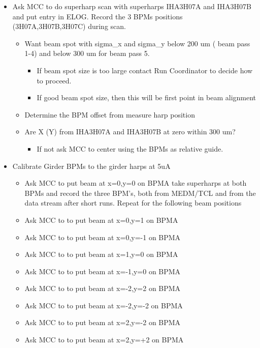 \documentclass[]{article}
\begin{document}
	\begin{itemize}
		\item
		Ask MCC to do superharp scan with superharps IHA3H07A and IHA3H07B and
		put entry in ELOG. Record the 3 BPMs positions (3H07A,3H07B,3H07C)
		during scan.
		
		\begin{itemize}
			\item
			Want beam spot with sigma\_x and sigma\_y below 200 um ( beam pass
			1-4) and below 300 um for beam pass 5.
			
			\begin{itemize}
				\item
				If beam spot size is too large contact Run Coordinator to decide
				how to proceed.
				\item
				If good beam spot size, then this will be first point in beam
				alignment
			\end{itemize}
			\item
			Determine the BPM offset from measure harp position
			\item
			Are X (Y) from IHA3H07A and IHA3H07B at zero within 300 um?
			
			\begin{itemize}
				\item
				If not ask MCC to center using the BPMs as relative guide.
			\end{itemize}
		\end{itemize}
		\item
		Calibrate Girder BPMs to the girder harps at 5uA
		
		\begin{itemize}
			\item Ask MCC to put beam at x=0,y=0 on BPMA take
			 superharps at both BPMs and record the three BPM's, both from MEDM/TCL and
			from the data stream after short runs. Repeat for the following beam positions
			\item
			Ask MCC to to put beam at x=0,y=1 on BPMA
			\item
			Ask MCC to to put beam at x=0,y=-1 on BPMA 
			\item
			Ask MCC to to put beam at x=1,y=0 on BPMA 
			\item
			Ask MCC to to put beam at x=-1,y=0 on BPMA 
			\item
			Ask MCC to to put beam at x=-2,y=2 on BPMA 
			\item
			Ask MCC to to put beam at x=-2,y=-2 on BPMA 
			\item
			Ask MCC to to put beam at x=2,y=-2 on BPMA 
			\item
			Ask MCC to to put beam at x=2,y=+2 on BPMA 
									

\end{itemize}
\end{itemize}
\end{document}
